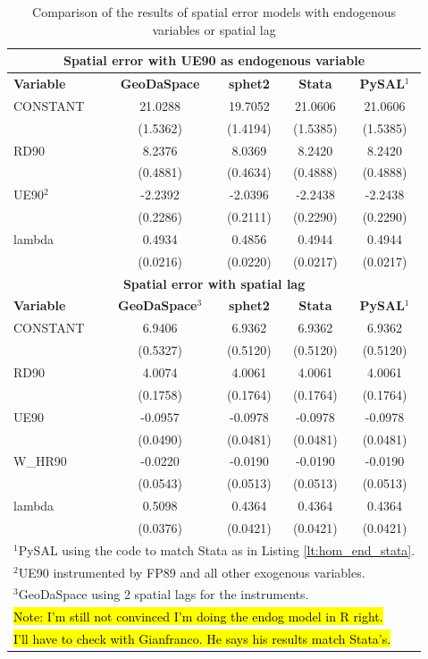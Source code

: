 \documentclass{article}
\begin{document}
\begin{table}[htpb]
\caption{Comparison of the results of spatial error models with endogenous variables or spatial lag}
\label{t:res_hom_endog}
\centering
\begin{small}
\begin{tabular}{l|cccc} \hline
\multicolumn{5}{c}{\textbf{Spatial error with UE90 as endogenous variable}} \\ \hline
\textbf{Variable}&\textbf{GeoDaSpace}&\textbf{sphet2}&\textbf{Stata}&\textbf{PySAL$^1$}\\ \hline
CONSTANT&21.0288&19.7052&21.0606&21.0606\\
&(1.5362)&(1.4194)&(1.5385)&(1.5385)\\
RD90&8.2376&8.0369&8.2420&8.2420\\
&(0.4881)&(0.4634)&(0.4888)&(0.4888)\\
UE90$^2$&-2.2392&-2.0396&-2.2438&-2.2438\\
&(0.2286)&(0.2111)&(0.2290)&(0.2290)\\
lambda&0.4934&0.4856&0.4944&0.4944\\
&(0.0216)&(0.0220)&(0.0217)&(0.0217)\\
\hline
\multicolumn{5}{c}{\textbf{Spatial error with spatial lag}} \\ \hline
\textbf{Variable}&\textbf{GeoDaSpace$^3$}&\textbf{sphet2}&\textbf{Stata}&\textbf{PySAL$^1$}\\ \hline
CONSTANT&6.9406&6.9362&6.9362&6.9362\\
&(0.5327)&(0.5120)&(0.5120)&(0.5120)\\
RD90&4.0074&4.0061&4.0061&4.0061\\
&(0.1758)&(0.1764)&(0.1764)&(0.1764)\\
UE90&-0.0957&-0.0978&-0.0978&-0.0978\\
&(0.0490)&(0.0481)&(0.0481)&(0.0481)\\
W\_HR90&-0.0220&-0.0190&-0.0190&-0.0190\\
&(0.0543)&(0.0513)&(0.0513)&(0.0513)\\
lambda&0.5098&0.4364&0.4364&0.4364\\
&(0.0376)&(0.0421)&(0.0421)&(0.0421)\\
\hline
\multicolumn{5}{l}{\scriptsize{$^1$PySAL using the code to match Stata as in Listing \ref{lt:hom_end_stata}.}} \\
\multicolumn{5}{l}{\scriptsize{$^2$UE90 instrumented by FP89 and all other exogenous variables.}} \\
\multicolumn{5}{l}{\scriptsize{$^3$GeoDaSpace using 2 spatial lags for the instruments.}} \\
\multicolumn{5}{l}{\scriptsize{\hl{Note: I'm still not convinced I'm doing the endog model in R right.}}} \\
\multicolumn{5}{l}{\scriptsize{\hl{I'll have to check with Gianfranco. He says his results match Stata's.}}} \\
\end{tabular}
\end{small}
\end{table}
\end{document}
